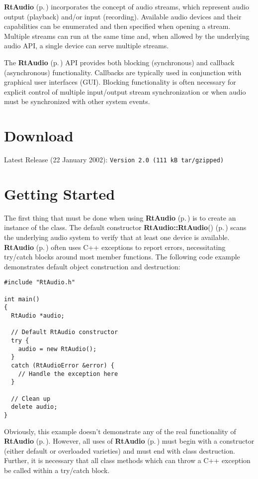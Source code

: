 {\bf Rt\-Audio} {\rm (p.\,\pageref{classRtAudio})} incorporates the concept of audio streams, which represent audio output (playback) and/or input (recording). Available audio devices and their capabilities can be enumerated and then specified when opening a stream. Multiple streams can run at the same time and, when allowed by the underlying audio API, a single device can serve multiple streams.

The {\bf Rt\-Audio} {\rm (p.\,\pageref{classRtAudio})} API provides both blocking (synchronous) and callback (asynchronous) functionality. Callbacks are typically used in conjunction with graphical user interfaces (GUI). Blocking functionality is often necessary for explicit control of multiple input/output stream synchronization or when audio must be synchronized with other system events.

\section{Download}\label{download}


Latest Release (22 January 2002): {\tt Version 2.0 (111 k\-B tar/gzipped)}

\section{Getting Started}\label{start}


The first thing that must be done when using {\bf Rt\-Audio} {\rm (p.\,\pageref{classRtAudio})} is to create an instance of the class. The default constructor {\bf Rt\-Audio::Rt\-Audio}() {\rm (p.\,\pageref{classRtAudio_a0})} scans the underlying audio system to verify that at least one device is available. {\bf Rt\-Audio} {\rm (p.\,\pageref{classRtAudio})} often uses C++ exceptions to report errors, necessitating try/catch blocks around most member functions. The following code example demonstrates default object construction and destruction:

\footnotesize\begin{verbatim}#include "RtAudio.h"

int main()
{
  RtAudio *audio;

  // Default RtAudio constructor
  try {
    audio = new RtAudio();
  }
  catch (RtAudioError &error) {
    // Handle the exception here
  }

  // Clean up
  delete audio;
}\end{verbatim}\normalsize 


Obviously, this example doesn't demonstrate any of the real functionality of {\bf Rt\-Audio} {\rm (p.\,\pageref{classRtAudio})}. However, all uses of {\bf Rt\-Audio} {\rm (p.\,\pageref{classRtAudio})} must begin with a constructor (either default or overloaded varieties) and must end with class destruction. Further, it is necessary that all class methods which can throw a C++ exception be called within a try/catch block.

